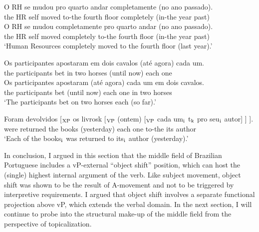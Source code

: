 \documentclass[output=paper]{langscibook}
\begin{document}
\begin{exe}
\ex \label{lacerda15}
\begin{xlist}
\ex \label{lacerda15a}
\gll O 	RH 	se 	mudou 	pro 	quarto	andar 	completamente	(no 	ano 	passado).\\
the 	HR 	self	moved	to-the	fourth	floor	completely 	(in-the	year	past)\\


\ex \label{lacerda15b}
\gll O 	RH 	se 	mudou 	completamente 	pro 	quarto	andar 	(no 	ano 	passado).\\
the 	HR 	self	moved	completely	to-the	fourth	floor	(in-the	year	past)\\
\glt‘Human Resources completely moved to the fourth floor (last year).’\\
\end{xlist}

\ex \label{lacerda16}
\begin{xlist}
\ex \label{lacerda16a}
\gll Os 	participantes 	apostaram 	em 	dois 	cavalos 	(até 	agora) 	cada 	um.\\
the	participants	bet	in	two	horses	(until	now)	each	one\\

\ex \label{lacerda16b}
\gll Os 	participantes 	apostaram 	(até 	agora) 	cada 	um	em 	dois 	cavalos.\\
the	participants	bet	(until	now)	each	one	in	two	horses\\
\glt‘The participants bet on two horses each (so far).’\\
\end{xlist}

\ex \label{lacerda17}
\gll Foram 	devolvidos [$_{\textnormal{XP}}$ os 	livrosk [$_{\textnormal{VP}}$ (ontem) 	[$_{\textnormal{VP}}$ cada 	um$_{\textnormal{i}}$ t$_{\textnormal{k}}$	pro 	seu$_{\textnormal{i}}$ 	autor] ] ].\\
were returned 	{}	the 	books 	{}	(yesterday) {}	each one {}	to-the	its 	author\\
\glt‘Each of the books$_{\textnormal{i}}$ was returned to its$_{\textnormal{i}}$ author (yesterday).’
\end{exe}

In conclusion, I argued in this section that the middle field of Brazilian Portuguese includes a vP-external “object shift” position, which can host the (single) highest internal argument of the verb. Like subject movement, object shift was shown to be the result of A-movement and not to be triggered by interpretive requirements. I argued that object shift involves a separate functional projection above vP, which extends the verbal domain. In the next section, I will continue to probe into the structural make-up of the middle field from the perspective of topicalization.
\end{document}
